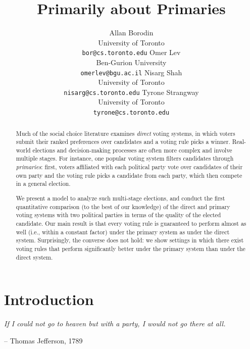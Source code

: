 \documentclass[letterpaper]{article} %
\theoremstyle{definition}
\begin{document}
%
\title{Primarily about Primaries}
\author{Allan Borodin\\University of Toronto\\\texttt{bor@cs.toronto.edu} \And Omer Lev\\Ben-Gurion University\\\texttt{omerlev@bgu.ac.il} \AND Nisarg Shah\\University of Toronto\\\texttt{nisarg@cs.toronto.edu} \And Tyrone Strangway\\University of Toronto\\\texttt{tyrone@cs.toronto.edu}}
\maketitle
\begin{abstract}
Much of the social choice literature examines \emph{direct} voting systems, in which voters submit their ranked preferences over candidates and a voting rule picks a winner. Real-world elections and decision-making processes are often more complex and involve multiple stages. For instance, one popular voting system filters candidates through \emph{primaries}: first, voters affiliated with each political party vote over candidates of their own party and the voting rule picks a candidate from each party, which then compete in a general election.

We present a model to analyze such multi-stage elections, and conduct the first quantitative comparison (to the best of our knowledge) of the direct and primary voting systems with two political parties in terms of the quality of the elected candidate. Our main result is that every voting rule is guaranteed to perform almost as well
(i.e., within a constant factor) under the primary system as under the direct system. Surprisingly, the converse does not hold: we show settings in which there exist voting rules that perform significantly better under the primary system than under the direct system.
\end{abstract}

\section{Introduction}

\epigraph{\emph{If I could not go to heaven but with a party, I would not go there at all.}}{-- Thomas Jefferson, 1789}
\end{document}
